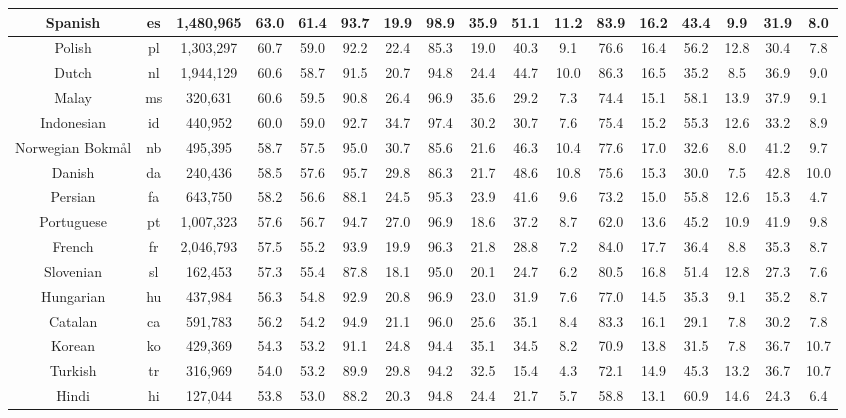 \begin{table*}
{\begin{tabular}{|c|c|c||c|c|c|c|c|c|c|c|c|c|c|c|c|c|}
Spanish & es & 1,480,965 & 63.0 & 61.4 & 93.7 & 19.9 & 98.9 & 35.9 & 51.1 & 11.2 & 83.9 & 16.2 & 43.4 & 9.9 & 31.9 & 8.0\\ \hline
Polish & pl & 1,303,297 & 60.7 & 59.0 & 92.2 & 22.4 & 85.3 & 19.0 & 40.3 & 9.1 & 76.6 & 16.4 & 56.2 & 12.8 & 30.4 & 7.8\\ \hline
Dutch & nl & 1,944,129 & 60.6 & 58.7 & 91.5 & 20.7 & 94.8 & 24.4 & 44.7 & 10.0 & 86.3 & 16.5 & 35.2 & 8.5 & 36.9 & 9.0\\ \hline
Malay & ms & 320,631 & 60.6 & 59.5 & 90.8 & 26.4 & 96.9 & 35.6 & 29.2 & 7.3 & 74.4 & 15.1 & 58.1 & 13.9 & 37.9 & 9.1\\ \hline
Indonesian & id & 440,952 & 60.0 & 59.0 & 92.7 & 34.7 & 97.4 & 30.2 & 30.7 & 7.6 & 75.4 & 15.2 & 55.3 & 12.6 & 33.2 & 8.9\\ \hline
Norwegian Bokmål & nb & 495,395 & 58.7 & 57.5 & 95.0 & 30.7 & 85.6 & 21.6 & 46.3 & 10.4 & 77.6 & 17.0 & 32.6 & 8.0 & 41.2 & 9.7\\ \hline
Danish & da & 240,436 & 58.5 & 57.6 & 95.7 & 29.8 & 86.3 & 21.7 & 48.6 & 10.8 & 75.6 & 15.3 & 30.0 & 7.5 & 42.8 & 10.0\\ \hline
Persian & fa & 643,750 & 58.2 & 56.6 & 88.1 & 24.5 & 95.3 & 23.9 & 41.6 & 9.6 & 73.2 & 15.0 & 55.8 & 12.6 & 15.3 & 4.7\\ \hline
Portuguese & pt & 1,007,323 & 57.6 & 56.7 & 94.7 & 27.0 & 96.9 & 18.6 & 37.2 & 8.7 & 62.0 & 13.6 & 45.2 & 10.9 & 41.9 & 9.8\\ \hline
French & fr & 2,046,793 & 57.5 & 55.2 & 93.9 & 19.9 & 96.3 & 21.8 & 28.8 & 7.2 & 84.0 & 17.7 & 36.4 & 8.8 & 35.3 & 8.7\\ \hline
Slovenian & sl & 162,453 & 57.3 & 55.4 & 87.8 & 18.1 & 95.0 & 20.1 & 24.7 & 6.2 & 80.5 & 16.8 & 51.4 & 12.8 & 27.3 & 7.6\\ \hline
Hungarian & hu & 437,984 & 56.3 & 54.8 & 92.9 & 20.8 & 96.9 & 23.0 & 31.9 & 7.6 & 77.0 & 14.5 & 35.3 & 9.1 & 35.2 & 8.7\\ \hline
Catalan & ca & 591,783 & 56.2 & 54.2 & 94.9 & 21.1 & 96.0 & 25.6 & 35.1 & 8.4 & 83.3 & 16.1 & 29.1 & 7.8 & 30.2 & 7.8\\ \hline
Korean & ko & 429,369 & 54.3 & 53.2 & 91.1 & 24.8 & 94.4 & 35.1 & 34.5 & 8.2 & 70.9 & 13.8 & 31.5 & 7.8 & 36.7 & 10.7\\ \hline
Turkish & tr & 316,969 & 54.0 & 53.2 & 89.9 & 29.8 & 94.2 & 32.5 & 15.4 & 4.3 & 72.1 & 14.9 & 45.3 & 13.2 & 36.7 & 10.7\\ \hline
Hindi & hi & 127,044 & 53.8 & 53.0 & 88.2 & 20.3 & 94.8 & 24.4 & 21.7 & 5.7 & 58.8 & 13.1 & 60.9 & 14.6 & 24.3 & 6.4\\ \hline

\end{tabular}}
\end{table*}
